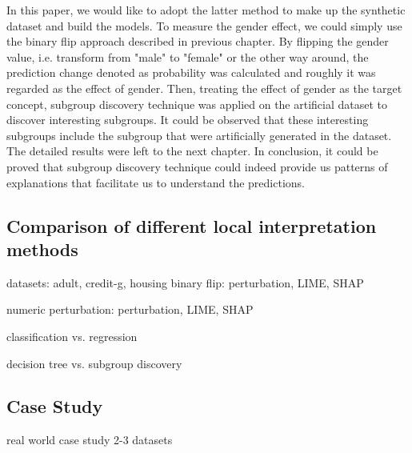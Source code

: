 In this paper, we would like to adopt the latter method to make up the synthetic dataset and build the models. To measure the gender effect, we could simply use the binary flip approach described in previous chapter. By flipping the gender value, i.e. transform from "male" to "female" or the other way around, the prediction change denoted as probability was calculated and roughly it was regarded as the effect of gender. Then, treating the effect of gender as the target concept, subgroup discovery technique was applied on the artificial dataset to discover interesting subgroups. It could be observed that these interesting subgroups include the subgroup that were artificially generated in the dataset. The detailed results were left to the next chapter. In conclusion, it could be proved that subgroup discovery technique could indeed provide us patterns of explanations that facilitate us to understand the predictions. 





\subsection{Comparison of different local interpretation methods}

datasets: adult, credit-g, housing
binary flip: perturbation, LIME, SHAP

numeric perturbation: perturbation, LIME, SHAP

classification vs. regression

decision tree vs. subgroup discovery

\subsection{Case Study}

real world case study 2-3 datasets